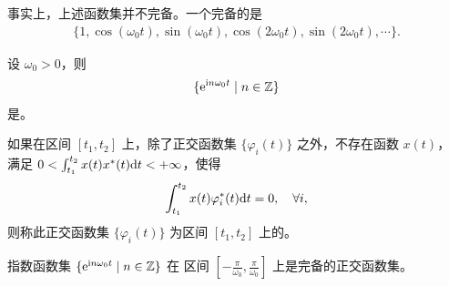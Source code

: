 \begin{note}
    事实上，上述函数集并不完备。一个完备的是
    \begin{align*}
        \{1, \cos(\omega_0t), \sin(\omega_0t), \cos(2\omega_0t), \sin(2\omega_0t), \cdots\}.
    \end{align*}
\end{note}

\begin{definition}[指数函数集]
    设 $\omega_0 > 0$，则
    \begin{align*}
        \{\mathrm{e}^{\mathrm{i} n\omega_0t} \mid n \in \mathbb{Z}\}
    \end{align*}
    是。
\end{definition}

\begin{definition}[完备的正交函数集]
    如果在区间 $[t_1, t_2]$ 上，除了正交函数集 $\{\varphi_i(t)\}$ 之外，不存在函数 $x(t)$，
    满足 $0 < \int_{t_1}^{t_2}x(t)x^*(t)\mathrm{d}{t} < +\infty$，使得
    \begin{align*}
        \int_{t_1}^{t_2}x(t)\varphi_i^*(t)\mathrm{d}{t} = 0, \quad \forall i,
    \end{align*}
    则称此正交函数集 $\{\varphi_i(t)\}$ 为区间 $[t_1, t_2]$ 上的。
\end{definition}

\begin{property}
    指数函数集 $\{\mathrm{e}^{\mathrm{i} n\omega_0t} \mid n \in \mathbb{Z}\}$ 在
    区间 $[-\frac{\pi}{\omega_0}, \frac{\pi}{\omega_0}]$ 上是完备的正交函数集。
\end{property}

